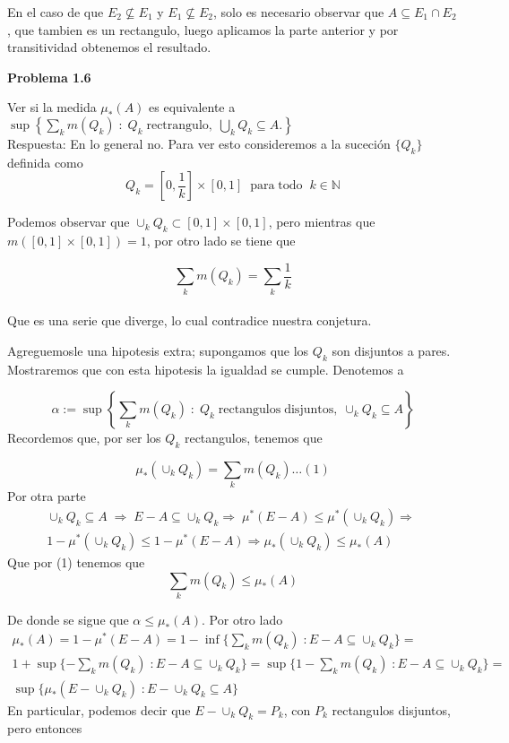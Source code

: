 \documentclass[12pt]{article}
\begin{document}
    En el caso de que $E_2\nsubseteq E_1$ y $E_1\nsubseteq E_2$, solo es necesario observar 
    que $A\subseteq E_1\cap E_2$, que tambien es un rectangulo, luego aplicamos la parte 
    anterior y por transitividad obtenemos el resultado.

    \newpage

    \textbf{Problema 1.6}

    Ver si la medida $\mu_*(A)$ es equivalente a  $\sup\left\{\sum\limits_k m(Q_k)\; :\; 
    Q_k\; \mathrm{rectrangulo},\;\bigcup\limits_k Q_k\subseteq A.\right\}$
    \\

    \noindent Respuesta: En lo general no. Para ver esto consideremos a la suceci\'on $\{Q_k\}$ 
    definida como 
    \[Q_k = \left[0,\frac{1}{k}\right]\times[0,1]\;\; \mathrm{para\; todo}\;\; k\in \mathbb{N}\]
    
    \noindent Podemos observar que $\cup_k Q_k \subset [0,1]\times [0,1]$, pero mientras que 
    $m([0,1]\times [0,1]) = 1$, por otro lado se tiene que 

    \[\sum_k m(Q_k) = \sum_k \frac{1}{k}\]
    \\
    Que es una serie que diverge, lo cual contradice nuestra conjetura. 

    Agreguemosle una hipotesis extra; supongamos que los $Q_k$ son disjuntos a pares. 
    Mostraremos que con esta hipotesis la igualdad se cumple. Denotemos a 

    \[\alpha := \sup\left\{\sum_k m(Q_k)\; :\;Q_k\; \mathrm{rectangulos \; disjuntos},\; \cup_k Q_k \subseteq A \right\}\]
    Recordemos que, por ser los $Q_k$ rectangulos, tenemos que 

    \[\mu_* (\cup_k Q_k) = \sum_k m(Q_k) \dotsc (1)\]
    Por otra parte
    \begin{gather*}
        \cup_k Q_k \subseteq A\; \Rightarrow\; E-A \subseteq \cup_k Q_k 
        \Rightarrow\; \mu^*(E-A) \leq \mu^*(\cup_k Q_k) \Rightarrow\; \\
        1-\mu^*(\cup_k Q_k) \leq 1-\mu^*(E-A) 
        \Rightarrow \mu_*(\cup_k Q_k) \leq \mu_*(A)
    \end{gather*}
    Que por (1) tenemos que 
    \[\sum_k m(Q_k) \leq \mu_*(A)\]

    \noindent De donde se sigue que $\alpha \leq \mu_*(A)$. Por otro lado
    \begin{gather*}
        \mu_*(A) = 1-\mu^*(E-A) = 1-\inf\{\sum\nolimits_k m(Q_k)\; : E-A\subseteq \cup_k Q_k\} = \\
        1+\sup\{-\sum\nolimits_k m(Q_k)\; : E-A\subseteq \cup_k Q_k\} = \sup\{1-\sum\nolimits_k m(Q_k)\; :E-A\subseteq \cup_k Q_k\} = \\
        \sup\{\mu_*(E-\cup_k Q_k)\; :E-\cup_k Q_k\subseteq A\}
    \end{gather*}
    En particular, podemos decir que $E-\cup_k Q_k = P_k$, con $P_k$ rectangulos disjuntos,
    pero entonces
\end{document}
